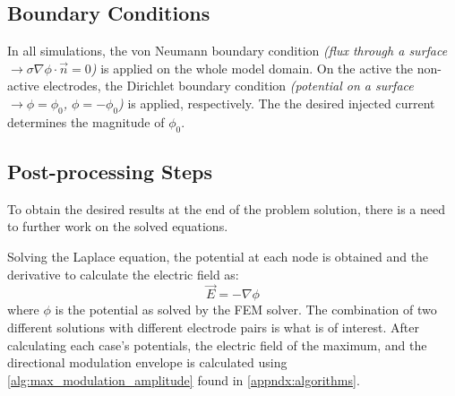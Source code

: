 \subsection{Boundary Conditions}
\label{subsec:solver_boundary_conditions}

In all simulations, the von Neumann boundary condition \textit{(flux through a surface $\rightarrow\sigma\nabla\phi\cdot\vec{n} = 0$)} is applied on the whole model domain. On the active the non-active electrodes, the Dirichlet boundary condition \textit{(potential on a surface $\rightarrow\phi = \phi_0$, $\phi = -\phi_0$)} is applied, respectively. The the desired injected current determines the magnitude of $\phi_0$.

\subsection{Post-processing Steps}

To obtain the desired results at the end of the problem solution, there is a need to further work on the solved equations.

Solving the Laplace equation, the potential at each node is obtained and the derivative to calculate the electric field as:
\begin{equation}
	\vec{E} = -\nabla\phi
\end{equation}
where $\phi$ is the potential as solved by the \gls{FEM} solver. The combination of two different solutions with different electrode pairs is what is of interest. After calculating each case's potentials, the electric field of the maximum, and the directional modulation envelope is calculated using \autoref{alg:max_modulation_amplitude} found in \autoref{appndx:algorithms}.
